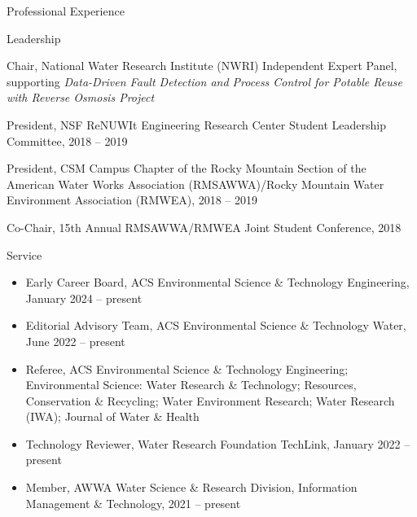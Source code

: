 \documentclass{resume} %
\begin{document}
\begin{rSection}{Professional Experience}
\begin{rSection}{Leadership}

Chair,  National Water Research Institute (NWRI) Independent Expert Panel, supporting \emph{Data-Driven Fault Detection and Process Control for Potable Reuse with Reverse Osmosis Project}

President, NSF ReNUWIt Engineering Research Center Student Leadership Committee, 2018 – 2019

President, CSM Campus Chapter of the Rocky Mountain Section of the American Water Works Association (RMSAWWA)/Rocky Mountain Water Environment Association (RMWEA), 2018 – 2019

Co-Chair, 15th Annual RMSAWWA/RMWEA Joint Student Conference, 2018

\end{rSection}

\newpage


\begin{rSection}{Service}



\begin{itemize}
\item Early Career Board, ACS Environmental Science \& Technology Engineering, January 2024 – present
\item Editorial Advisory Team, ACS Environmental Science \& Technology Water, June 2022 – present
\item Referee, ACS Environmental Science \& Technology Engineering; Environmental Science: Water Research \& Technology; Resources, Conservation \& Recycling; Water Environment Research; Water Research (IWA); Journal of Water \& Health
\item Technology Reviewer, Water Research Foundation TechLink, January 2022 – present
\item Member, AWWA Water Science \& Research Division, Information Management \& Technology, 2021 – present
\end{itemize}


\end{rSection}
\end{rSection}
\end{document}
